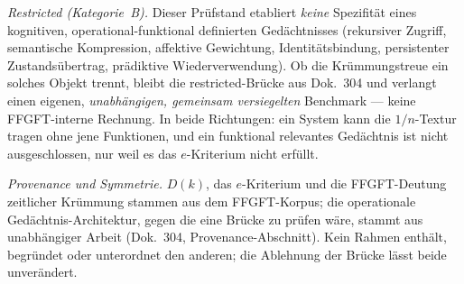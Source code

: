 \emph{Restricted (Kategorie~B).} Dieser Prüfstand etabliert \emph{keine} Spezifität eines
kognitiven, operational-funktional definierten Gedächtnisses (rekursiver Zugriff, semantische
Kompression, affektive Gewichtung, Identitätsbindung, persistenter Zustandsübertrag, prädiktive
Wiederverwendung). Ob die Krümmungstreue ein solches Objekt trennt, bleibt die restricted-Brücke
aus Dok.~304 und verlangt einen eigenen, \emph{unabhängigen, gemeinsam versiegelten} Benchmark
--- keine FFGFT-interne Rechnung. In beide Richtungen: ein System kann die $1/n$-Textur tragen
ohne jene Funktionen, und ein funktional relevantes Gedächtnis ist nicht ausgeschlossen, nur
weil es das $e$-Kriterium nicht erfüllt.

\emph{Provenance und Symmetrie.} $D(k)$, das $e$-Kriterium und die FFGFT-Deutung zeitlicher
Krümmung stammen aus dem FFGFT-Korpus; die operationale Gedächtnis-Architektur, gegen die eine
Brücke zu prüfen wäre, stammt aus unabhängiger Arbeit (Dok.~304, Provenance-Abschnitt). Kein
Rahmen enthält, begründet oder unterordnet den anderen; die Ablehnung der Brücke lässt beide
unverändert.
